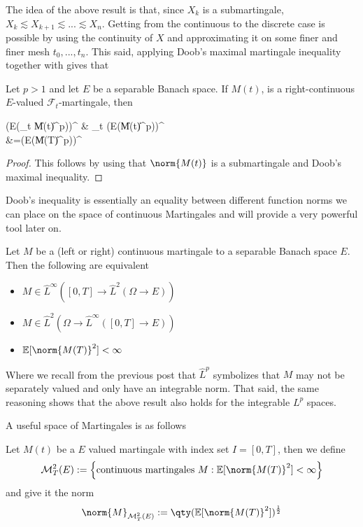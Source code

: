 \documentclass[
    a4paper,
    DIV=14,
    abstract=true,
    numbers=noenddot
]{scrartcl}
\begin{document}
The idea of the above result is that, since $X_k$ is a submartingale, $X_k\lesssim X_{k+1}\lesssim...\lesssim X_n$. Getting from the continuous to the discrete case is possible by using the continuity of $X$ and approximating it on some finer and finer mesh $t_0,...,t_n$. This said, applying Doob's maximal martingale inequality together with  gives that
\begin{theorem}\label{thm:doobs_hilbert} Let $p>1$ and let $E$ be a separable Banach space.
	If $M(t)$, is a right-continuous $E$-valued $\mathcal{F}_{t}$-martingale, then
	\begin{aligneq*}
		\left(E\left(\sup _{t \in[0, T]}\|M(t)\|^{p}\right)\right)^{} &\leq {} \sup _{t \in[0, T]}\left(E\left(\|M(t)\|^{p}\right)\right)^{} \\
		&=\left(E\left(\|M(T)\|^{p}\right)\right)^{}
	\end{aligneq*}
\end{theorem}
\begin{proof}
	This follows by using that $\norm{M(t)}$ is a submartingale and Doob's maximal inequality.
\end{proof}
Doob's inequality is essentially an equality between different function norms we can place on the space of continuous Martingales and will provide a very powerful tool later on.
\begin{corollary}
	Let $M$ be a (left or right) continuous martingale to a separable Banach space $E$. Then the following are equivalent
	\begin{itemize}
		\item $M\in \hat{L}^\infty([0,T]\to \hat{L}^2(\Omega\to E))$
		\item  $M\in \hat{L}^2(\Omega\to \hat{L}^\infty([0,T]\to E))$
		\item $\mathbb{E}[\norm{M(T)}^2]<\infty$
	\end{itemize}
	Where we recall from the previous post that $\hat{L}^p$ symbolizes that $M$ may not be separately valued and only have an integrable norm. That said, the same reasoning shows that the above result also holds for the integrable $L^p$ spaces.
\end{corollary}
A useful space of Martingales is as follows
\begin{definition}
	Let $M(t)$ be a $E$ valued martingale with index set $I=[0,T]$, then we define
	\begin{equation*}
		\mathcal{M}_T^2(E):=\left\{\text{continuous martingales } M:\mathbb{E}[\norm{M(T)}^2]<\infty\right\}
	\end{equation*}
	and give it the norm
	\begin{equation*}
		\norm{M}_{\mathcal{M}_T^2(E)}:=\qty(\mathbb{E}[\norm{M(T)}^2])^ \frac{1}{2}
	\end{equation*}
\end{definition}
\end{document}
